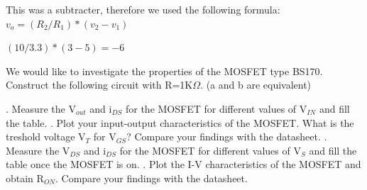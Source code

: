 {\begin{solution}
		This was a subtracter, therefore we used the following formula:
		\newline
		$v_{o}=(R_{2}/R_{1})*(v_{2}-v_{1})$
		
		$(10/3.3)*(3-5)=-6$
	\end{solution}
	\clearpage
	\begin{problem}
		We would like to investigate the properties of the MOSFET type BS170. Construct the following circuit with R=1K\(\Omega\). (a and b are equivalent)

		. Measure the V\(_{out}\) and i\(_{DS}\) for the MOSFET for different values of V\(_{IN}\) and fill the table.
		. Plot your input-output characteristics of the MOSFET. What is the treshold voltage V\(_{T}\) for V\(_{GS}\)? Compare your findings with the datasheet.
		. Measure the V\(_{DS}\) and i\(_{DS}\) for the MOSFET for different values of V\(_{S}\) and fill the table once the MOSFET is on.
		. Plot the I-V characteristics of the MOSFET and obtain R\(_{ON}\). Compare your findings with the datasheet.
	\end{problem}
	
}
